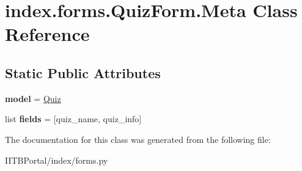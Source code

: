\hypertarget{classindex_1_1forms_1_1QuizForm_1_1Meta}{}\section{index.\+forms.\+Quiz\+Form.\+Meta Class Reference}
\label{classindex_1_1forms_1_1QuizForm_1_1Meta}
\subsection*{Static Public Attributes}
\begin{DoxyCompactItemize}
\item 
\mbox{\label{classindex_1_1forms_1_1QuizForm_1_1Meta_a1230e1b8fdfd0dd580274cb08bac0347}} 
{\bfseries model} = \hyperlink{classindex_1_1models_1_1Quiz}{Quiz}
\item 
\mbox{\label{classindex_1_1forms_1_1QuizForm_1_1Meta_aa190a554c9a0ed0e9bb161bf7c936472}} 
list {\bfseries fields} = \mbox{[}\textquotesingle{}quiz\+\_\+name\textquotesingle{}, \textquotesingle{}quiz\+\_\+info\textquotesingle{}\mbox{]}
\end{DoxyCompactItemize}


The documentation for this class was generated from the following file\+:\begin{DoxyCompactItemize}
\item 
I\+I\+T\+B\+Portal/index/forms.\+py\end{DoxyCompactItemize}
